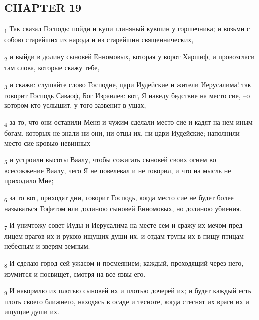 \subsection{CHAPTER 19}
\begin{tcolorbox}
\textsubscript{1} Так сказал Господь: пойди и купи глиняный кувшин у горшечника; и возьми с собою старейших из народа и из старейшин священнических,
\end{tcolorbox}
\begin{tcolorbox}
\textsubscript{2} и выйди в долину сыновей Енномовых, которая у ворот Харшиф, и провозгласи там слова, которые скажу тебе,
\end{tcolorbox}
\begin{tcolorbox}
\textsubscript{3} и скажи: слушайте слово Господне, цари Иудейские и жители Иерусалима! так говорит Господь Саваоф, Бог Израилев: вот, Я наведу бедствие на место сие, --о котором кто услышит, у того зазвенит в ушах,
\end{tcolorbox}
\begin{tcolorbox}
\textsubscript{4} за то, что они оставили Меня и чужим сделали место сие и кадят на нем иным богам, которых не знали ни они, ни отцы их, ни цари Иудейские; наполнили место сие кровью невинных
\end{tcolorbox}
\begin{tcolorbox}
\textsubscript{5} и устроили высоты Ваалу, чтобы сожигать сыновей своих огнем во всесожжение Ваалу, чего Я не повелевал и не говорил, и что на мысль не приходило Мне;
\end{tcolorbox}
\begin{tcolorbox}
\textsubscript{6} за то вот, приходят дни, говорит Господь, когда место сие не будет более называться Тофетом или долиною сыновей Енномовых, но долиною убиения.
\end{tcolorbox}
\begin{tcolorbox}
\textsubscript{7} И уничтожу совет Иуды и Иерусалима на месте сем и сражу их мечом пред лицем врагов их и рукою ищущих души их, и отдам трупы их в пищу птицам небесным и зверям земным.
\end{tcolorbox}
\begin{tcolorbox}
\textsubscript{8} И сделаю город сей ужасом и посмеянием; каждый, проходящий через него, изумится и посвищет, смотря на все язвы его.
\end{tcolorbox}
\begin{tcolorbox}
\textsubscript{9} И накормлю их плотью сыновей их и плотью дочерей их; и будет каждый есть плоть своего ближнего, находясь в осаде и тесноте, когда стеснят их враги их и ищущие души их.
\end{tcolorbox}
